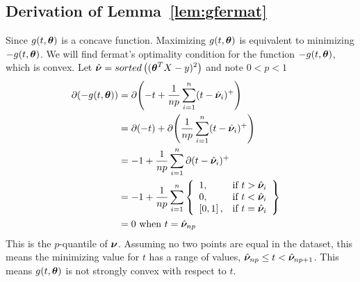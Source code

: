 \documentclass{article} %
\begin{document}
\begin{appendices}
	\subsection{Derivation of Lemma~\ref{lem:gfermat}}
	\label{app:gfermat}
	Since $\displaystyle g(t,{\bm{\theta}})$ is a concave function. Maximizing $g(t,{\bm{\theta}})$ is equivalent to minimizing $-g(t,{\bm{\theta}})$. We will find fermat's optimality condition for the function $\displaystyle -g(t,{\bm{\theta}})$, which is convex. 
	Let $\displaystyle \hat{{\bm{\nu}}} = sorted\left(({\bm{\theta}}^T X - y)^2\right)$ and note $\displaystyle 0 < p < 1$
	\begin{align}
		\partial{\displaystyle (-g(t,\boldsymbol{\theta}})) &= \partial{\left(-t + \frac{1}{np}\sum_{i=1}^{n}(t-\hat{{\bm{\nu}}}_i)^+\right)} &&\\
		&= \partial{(-t)} + \partial{\left(\frac{1}{np}\sum_{i=1}^{n}(t-\hat{{\bm{\nu}}}_i)^+\right)}&&\\
		&= -1 + \frac{1}{np}\sum_{i=1}^{n}\partial{(t-\hat{{\bm{\nu}}}_i)^+} &&\\
		&= -1 + \frac{1}{np}\sum_{i=1}^{n}
		\left\{
		\begin{array}{lr}
			1, & \text{if } t > \hat{{\bm{\nu}}}_i\\
			0, & \text{if } t < \hat{{\bm{\nu}}}_i \\
			\left[0,1\right], & \text{if } t = \hat{{\bm{\nu}}}_i \\
		\end{array}
		\right\}&&\\
		&= 0 \text{ when }\displaystyle t = \hat{{\bm{\nu}}}_{np}&&
	\end{align}
	This is the $p$-quantile of $\displaystyle {\bm{\nu}}$. Assuming no two points are equal in the dataset, this means the minimizing value for $t$ has a range of values, $\hat{{\bm{\nu}}}_{np} \leq t < \hat{{\bm{\nu}}}_{np+1}$. This means $g(t,{\bm{\theta}})$ is not strongly convex with respect to $t$. 

\end{appendices}
\end{document}
